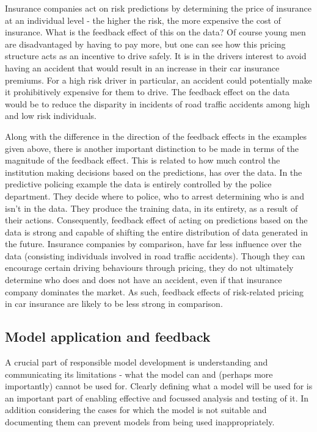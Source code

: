 Insurance companies act on risk predictions by determining the price of insurance at an individual level - the higher the risk, the more expensive the cost of insurance. What is the feedback effect of this on the data? Of course young men are disadvantaged by having to pay more, but one can see how this pricing structure acts as an incentive to drive safely. It is in the drivers interest to avoid having an accident that would result in an increase in their car insurance premiums. For a high risk driver in particular, an accident could potentially make it prohibitively expensive for them to drive. The feedback effect on the data would be to reduce the disparity in incidents of road traffic accidents among high and low risk individuals.

Along with the difference in the direction of the feedback effects in the examples given above, there is another important distinction to be made in terms of the magnitude of the feedback effect. This is related to how much control the institution making decisions based on the predictions, has over the data. In the predictive policing example the data is entirely controlled by the police department. They decide where to police, who to arrest determining who is and isn't in the data. They produce the training data, in its entirety, as a result of their actions. Consequently, feedback effect of acting on predictions based on the data is strong and capable of shifting the entire distribution of data generated in the future. Insurance companies by comparison, have far less influence over the data (consisting individuals involved in road traffic accidents). Though they can encourage certain driving behaviours through pricing, they do not ultimately determine who does and does not have an accident, even if that insurance company dominates the market. As such, feedback effects of risk-related pricing in car insurance are likely to be less strong in comparison.

\subsection{Model application and feedback}

A crucial part of responsible model development is understanding and communicating its limitations - what the model can and (perhaps more importantly) cannot be used for. Clearly defining what a model will be used for is an important part of enabling effective and focussed analysis and testing of it. In addition considering the cases for which the model is not suitable and documenting them can prevent models from being used inappropriately.

